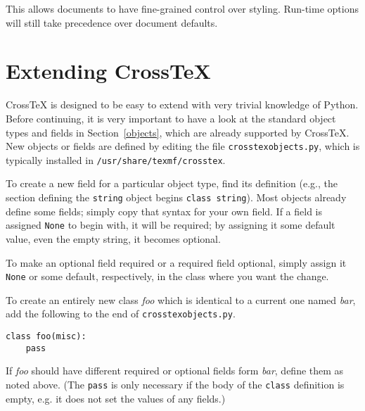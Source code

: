 \documentclass{article}
\newcommand{\XTeX}{Cross\TeX}
\begin{document}
\begin{small}\begin{verbatim}

\end{verbatim}\end{small}

This allows documents to have fine-grained control over styling. Run-time options will still take precedence over document defaults.



\section{Extending \XTeX{}}
\label{extending}

\XTeX{} is designed to be easy to extend with very trivial knowledge of Python. Before continuing, it is very important to have a look at the standard object types and fields in Section~\ref{objects}, which are already supported by \XTeX{}. New objects or fields are defined by editing the file \texttt{crosstexobjects.py}, which is typically installed in \texttt{/usr/share/texmf/crosstex}.

To create a new field for a particular object type, find its definition (e.g., the section defining the \texttt{string} object begins \texttt{class string}). Most objects already define some fields; simply copy that syntax for your own field. If a field is assigned \texttt{None} to begin with, it will be required; by assigning it some default value, even the empty string, it becomes optional.

To make an optional field required or a required field optional, simply assign it \texttt{None} or some default, respectively, in the class where you want the change.

To create an entirely new class \textit{foo} which is identical to a current one named \textit{bar}, add the following to the end of \texttt{crosstexobjects.py}.

\begin{small}\begin{verbatim}
class foo(misc):
    pass
\end{verbatim}\end{small}

If \textit{foo} should have different required or optional fields form \textit{bar}, define them as noted above. (The \texttt{pass} is only necessary if the body of the \texttt{class} definition is empty, e.g. it does not set the values of any fields.)
\end{document}
